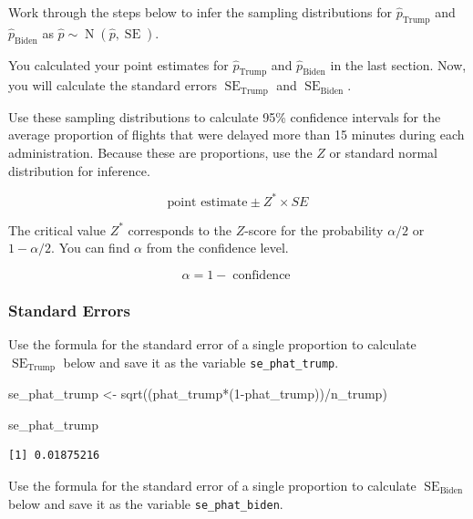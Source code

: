 \documentclass[
  letterpaper,
  DIV=11,
  numbers=noendperiod]{scrartcl}
\newenvironment{Shaded}{\begin{snugshade}}{\end{snugshade}}
\newcommand{\DecValTok}[1]{\textcolor[rgb]{0.68,0.00,0.00}{#1}}
\newcommand{\FunctionTok}[1]{\textcolor[rgb]{0.28,0.35,0.67}{#1}}
\newcommand{\NormalTok}[1]{\textcolor[rgb]{0.00,0.23,0.31}{#1}}
\newcommand{\OtherTok}[1]{\textcolor[rgb]{0.00,0.23,0.31}{#1}}
\newcommand{\SpecialCharTok}[1]{\textcolor[rgb]{0.37,0.37,0.37}{#1}}
\begin{document}
Work through the steps below to infer the sampling distributions for
\(\hat{p}_{\text{Trump}}\) and \(\hat{p}_{\text{Biden}}\) as
\(\hat{p} \sim \operatorname{N}\left(\hat{p}, \operatorname{SE}\right)\).

You calculated your point estimates for \(\hat{p}_{\text{Trump}}\) and
\(\hat{p}_{\text{Biden}}\) in the last section. Now, you will calculate
the standard errors \(\operatorname{SE}_{\text{Trump}}\) and
\(\operatorname{SE}_{\text{Biden}}\).

Use these sampling distributions to calculate 95\% confidence intervals
for the average proportion of flights that were delayed more than 15
minutes during each administration. Because these are proportions, use
the \(Z\) or standard normal distribution for inference.

\[
\text{point estimate} \pm Z^* \times SE
\]

The critical value \(Z^*\) corresponds to the \(Z\)-score for the
probability \(\alpha/2\) or \(1-\alpha/2\). You can find \(\alpha\) from
the confidence level.

\[
\alpha=1-\operatorname{confidence}
\]

\subsubsection{Standard Errors}\label{standard-errors}

Use the formula for the standard error of a single proportion to
calculate \(\operatorname{SE}_{\text{Trump}}\) below and save it as the
variable \texttt{se\_phat\_trump}.

\begin{Shaded}
\begin{Highlighting}[]
\NormalTok{se\_phat\_trump }\OtherTok{\textless{}{-}} \FunctionTok{sqrt}\NormalTok{((phat\_trump}\SpecialCharTok{*}\NormalTok{(}\DecValTok{1}\SpecialCharTok{{-}}\NormalTok{phat\_trump))}\SpecialCharTok{/}\NormalTok{n\_trump)}

\NormalTok{se\_phat\_trump}
\end{Highlighting}
\end{Shaded}

\begin{verbatim}
[1] 0.01875216
\end{verbatim}

Use the formula for the standard error of a single proportion to
calculate \(\operatorname{SE}_{\text{Biden}}\) below and save it as the
variable \texttt{se\_phat\_biden}.
\end{document}

